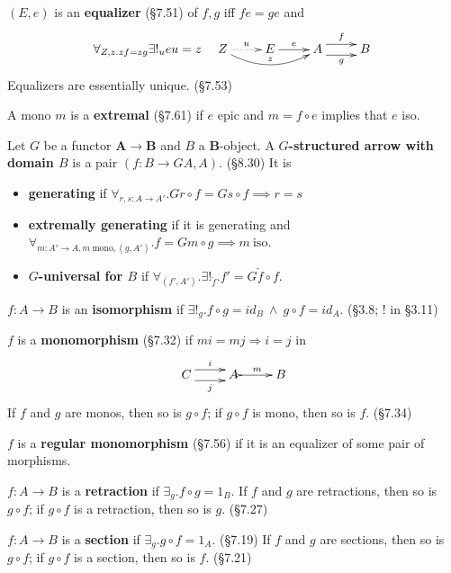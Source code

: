 \documentclass[10pt,twocolumn,letterpaper]{article}
\newcommand{\defn}[1]{{\bf #1}}
\begin{document}
  $(E,e)$ is an \defn{equalizer} (\S7.51) of $f,g$ iff $fe = ge$ and
     \[\forall_{Z,z . zf = zg} \exists!_u eu = z \quad
     \xymatrix{
     Z \ar@{..>}[r]^u \ar@/_1pc/[rr]^{z} & E \ar[r]^e & A \ar@<1ex>[r]^f \ar@<-1ex>[r]_g & B \\
     }\]
  Equalizers are essentially unique. (\S7.53)

  A mono $m$ is a \defn{extremal} (\S7.61) if $e$ epic and
  $m = f \circ e$ implies that $e$ iso.

  Let $G$ be a functor $\mathbf{A} \to \mathbf{B}$ and $B$ a
  $\mathbf{B}$-object. A \defn{$G$-structured arrow with domain $B$}
  is a pair $(f : B \to GA, A)$. (\S8.30)  It is
  \begin{itemize}
    \item \defn{generating} if $\forall_{r,s : A \to A'} . Gr \circ f = Gs
      \circ f \implies r = s$
    \item \defn{extremally generating} if it is generating and $\forall_{m :
      A' \to A, m ~\text{mono}, (g,A')} . f = Gm \circ g \implies m ~\text{iso}$.
    \item \defn{$G$-universal for $B$} if $\forall_{(f', A')} .
    \exists!_{\check f} . f' = G{\check f} \circ f$.
  \end{itemize}

  $f : A \to B$ is an \defn{isomorphism} if $\exists!_g . f \circ g = id_B
    ~\wedge~ g \circ f = id_A$. (\S3.8; ! in \S3.11)

  $f$ is a \defn{monomorphism} (\S7.32) if $mi = mj \Rightarrow i = j$ in
    \[\xymatrix{C \ar@<1ex>[r]^{i} \ar@<-1ex>[r]_j & A \ar@{>->}[r]^m & B} \]
  If $f$ and $g$ are monos, then so is $g \circ f$; if $g \circ f$ is mono,
  then so is $f$. (\S7.34)

  $f$ is a \defn{regular monomorphism} (\S7.56) if it is an equalizer of
  some pair of morphisms.

  $f : A \to B$ is a \defn{retraction} if $\exists_g . f \circ g = 1_B$.
  If $f$ and $g$ are retractions, then so is $g \circ f$; if $g \circ f$
  is a retraction, then so is $g$. (\S7.27)

  $f : A \to B$ is a \defn{section} if $\exists_g . g \circ f = 1_A$.
  (\S7.19)
  If $f$ and $g$ are sections, then so is $g \circ f$;
  if $g \circ f$ is a section, then so is $f$. (\S7.21)
\end{document}
